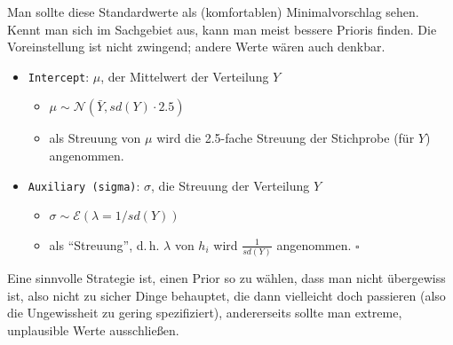 \documentclass[
  ngerman,
  letterpaper,
  twoside,
  open=any]{scrbook}
\providecommand{\tightlist}{%
  \setlength{\itemsep}{0pt}\setlength{\parskip}{0pt}}\usepackage{longtable,booktabs,array}
\theoremstyle{definition}
\theoremstyle{plain}
\theoremstyle{definition}
\theoremstyle{definition}
\theoremstyle{definition}
\theoremstyle{definition}
\theoremstyle{remark}
\begin{document}
Man sollte diese Standardwerte als (komfortablen) Minimalvorschlag
sehen. Kennt man sich im Sachgebiet aus, kann man meist bessere Prioris
finden. Die Voreinstellung ist nicht zwingend; andere Werte wären auch
denkbar.

\begin{tcolorbox}[enhanced jigsaw, arc=.35mm, bottomrule=.15mm, bottomtitle=1mm, breakable, colback=white, colbacktitle=quarto-callout-note-color!10!white, colframe=quarto-callout-note-color-frame, coltitle=black, left=2mm, leftrule=.75mm, opacityback=0, opacitybacktitle=0.6, rightrule=.15mm, title=\textcolor{quarto-callout-note-color}{\faInfo}\hspace{0.5em}{Standardwerte von \texttt{stan\_glm}}, titlerule=0mm, toprule=.15mm, toptitle=1mm]

\begin{itemize}
\tightlist
\item
  \texttt{Intercept}: \(\mu\), der Mittelwert der Verteilung \(Y\)

  \begin{itemize}
  \tightlist
  \item
    \(\mu \sim \mathcal{N}(\bar{Y}, sd(Y)\cdot 2.5)\)
  \item
    als Streuung von \(\mu\) wird die 2.5-fache Streuung der Stichprobe
    (für \(Y\)) angenommen.
  \end{itemize}
\item
  \texttt{Auxiliary\ (sigma)}: \(\sigma\), die Streuung der Verteilung
  \(Y\)

  \begin{itemize}
  \tightlist
  \item
    \(\sigma \sim \mathcal{E}(\lambda=1/sd(Y))\)
  \item
    als \enquote{Streuung}, d.\,h. \(\lambda\) von \(h_i\) wird
    \(\frac{1}{sd(Y)}\) angenommen. \(\square\)
  \end{itemize}
\end{itemize}

\end{tcolorbox}

Eine sinnvolle Strategie ist, einen Prior so zu wählen, dass man nicht
übergewiss ist, also nicht zu sicher Dinge behauptet, die dann
vielleicht doch passieren (also die Ungewissheit zu gering
spezifiziert), andererseits sollte man extreme, unplausible Werte
ausschließen.
\end{document}
